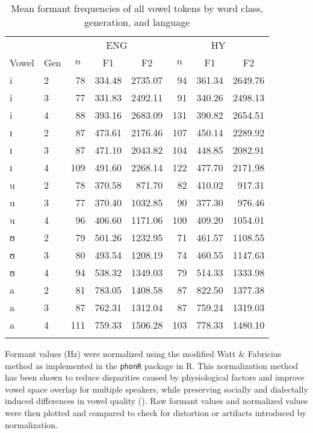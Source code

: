 \documentclass[output=paper]{langsci/langscibook}
\begin{document}
\begin{table}
\begin{tabular}{ll *{6}{r}}
\lsptoprule
	& & \multicolumn{3}{c}{ENG} & \multicolumn{3}{c}{HY}\\\cmidrule(lr){3-5}\cmidrule(lr){6-8}
{Vowel} & {Gen} & \multicolumn{1}{c}{$n$} & \multicolumn{1}{c}{F1} & \multicolumn{1}{c}{F2} & \multicolumn{1}{c}{$n$} & \multicolumn{1}{c}{F1} & \multicolumn{1}{c}{F2}\\
\midrule
i & 2 & 78 & 334.48 & 2735.07 & 94 & 361.34 & 2649.76\\
i & 3 & 77 & 331.83 & 2492.11 & 91 & 340.26 & 2498.13\\
i & 4 & 88 & 393.16 & 2683.09 & 131 & 390.82 & 2654.51\\
ɪ & 2 & 87 & 473.61 & 2176.46 & 107 & 450.14 & 2289.92\\
ɪ & 3 & 87 & 471.10 & 2043.82 & 104 & 448.85 & 2082.91\\
ɪ & 4 & 109 & 491.60 & 2268.14 & 122 & 477.70 & 2171.98\\
u & 2 & 78 & 370.58 & 871.70 & 82 & 410.02 & 917.31\\
u & 3 & 77 & 370.40 & 1032.85 & 90 & 377.30 & 976.46\\
u & 4 & 96 & 406.60 & 1171.06 & 100 & 409.20 & 1054.01\\
ʊ & 2 & 79 & 501.26 & 1232.95 & 71 & 461.57 & 1108.55\\
ʊ & 3 & 80 & 493.54 & 1208.19 & 74 & 460.55 & 1147.63\\
ʊ & 4 & 94 & 538.32 & 1349.03 & 79 & 514.33 & 1333.98\\
a & 2 & 81 & 783.05 & 1408.58 & 87 & 822.50 & 1377.38\\
a & 3 & 87 & 762.31 & 1312.04 & 87 & 759.24 & 1319.03\\
a & 4 & 111 & 759.33 & 1506.28 & 103 & 778.33 & 1480.10\\
\lspbottomrule
\end{tabular}
\caption{Mean formant frequencies of all vowel tokens by word class, generation, and language\label{tab:nove:2}}
\end{table}


Formant values (Hz) were normalized using the modified Watt \& Fabricius method as implemented in the \texttt{phonR} package \citep{McCloy2016} in R. This normalization method has been shown to reduce disparities caused by physiological factors and improve vowel space overlap for multiple speakers, while preserving socially and dialectally induced differences in vowel quality (\citealt{FabriciusEtAl2009, WattFabricius2002}). Raw formant values and normalized values were then plotted and compared to check for distortion or artifacts introduced by normalization. 
\end{document}
